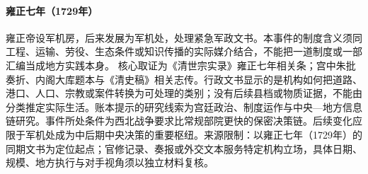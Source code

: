 \hypertarget{civic:EQ-1729-JUNJICHU-FOUNDING}{}\paragraph{雍正七年（1729年）}雍正帝设军机房，后来发展为军机处，处理紧急军政文书。本事件的制度含义须同工程、运输、劳役、生态条件或知识传播的实际媒介结合，不能把一道制度或一部汇编当成地方实践本身。 核心取证为《清世宗实录》雍正七年相关条；宫中朱批奏折、内阁大库题本与《清史稿》相关志传。行政文书显示的是机构如何把道路、港口、人口、宗教或案件转换为可处理的类别；没有后续县档或物质证据，不能由分类推定实际生活。账本提示的研究线索为宫廷政治、制度运作与中央—地方信息链研究。事件所处条件为西北战争要求比常规部院更快的保密决策链。后续变化应限于军机处成为中后期中央决策的重要枢纽。来源限制：以雍正七年（1729年）的同期文书为定位起点；官修记录、奏报或外交文本服务特定机构立场，具体日期、规模、地方执行与对手视角须以独立材料复核。
